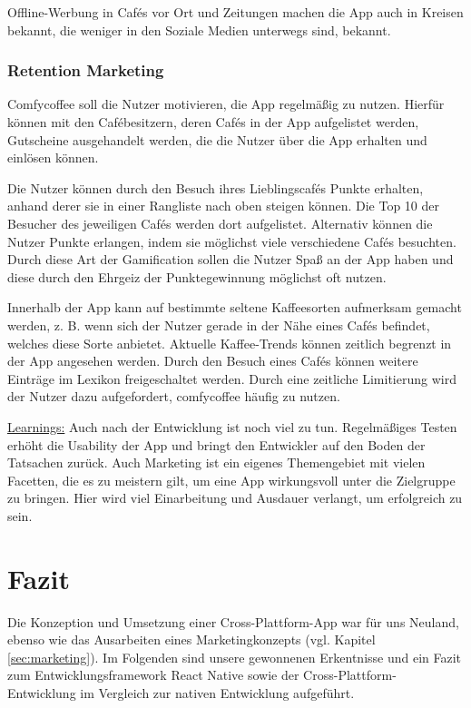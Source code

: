 Offline-Werbung in Cafés vor Ort und Zeitungen machen die App auch in Kreisen bekannt, die weniger in den Soziale Medien unterwegs sind, bekannt.

\subsection{Retention Marketing}
Comfycoffee soll die Nutzer motivieren, die App regelmäßig zu nutzen. Hierfür können mit den Cafébesitzern, deren Cafés in der App aufgelistet werden, Gutscheine ausgehandelt werden, die die Nutzer über die App erhalten und einlösen können.

Die Nutzer können durch den Besuch ihres Lieblingscafés Punkte erhalten, anhand derer sie in einer Rangliste nach oben steigen können. Die Top 10 der Besucher des jeweiligen Cafés werden dort aufgelistet. Alternativ können die Nutzer Punkte erlangen, indem sie möglichst viele verschiedene Cafés besuchten. Durch diese Art der Gamification sollen die Nutzer Spaß an der App haben und diese durch den Ehrgeiz der Punktegewinnung möglichst oft nutzen.

Innerhalb der App kann auf bestimmte seltene Kaffeesorten aufmerksam gemacht werden, z. B. wenn sich der Nutzer gerade in der Nähe eines Cafés befindet, welches diese Sorte anbietet. Aktuelle Kaffee-Trends können zeitlich begrenzt in der App angesehen werden. Durch den Besuch eines Cafés können weitere Einträge im Lexikon freigeschaltet werden. Durch eine zeitliche Limitierung wird der Nutzer dazu aufgefordert, comfycoffee häufig zu nutzen.

\underline{Learnings:}
Auch nach der Entwicklung ist noch viel zu tun. Regelmäßiges Testen erhöht die Usability der App und bringt den Entwickler auf den Boden der Tatsachen zurück. Auch Marketing ist ein eigenes Themengebiet mit vielen Facetten, die es zu meistern gilt, um eine App wirkungsvoll unter die Zielgruppe zu bringen. Hier wird viel Einarbeitung und Ausdauer verlangt, um erfolgreich zu sein.

\chapter{Fazit}
\label{fazit}
Die Konzeption und Umsetzung einer Cross-Plattform-App war für uns Neuland, ebenso wie das Ausarbeiten eines Marketingkonzepts (vgl. Kapitel \ref{sec:marketing}). Im Folgenden sind unsere gewonnenen Erkentnisse und ein Fazit zum Entwicklungsframework React Native sowie der Cross-Plattform-Entwicklung im Vergleich zur nativen Entwicklung aufgeführt.

